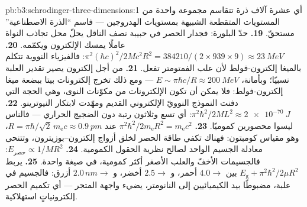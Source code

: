 \begin{solution}{pb:b3:schrodinger-three-dimensions:1}
أي عشرة آلاف ذرة تتقاسم مجموعة واحدة من المستويات المتقطعة
الشبيهة بمستويات الهدروجين --- فاسم ``الذرة الاصطناعية'' مستحقّ.
\textbf{19.} حدّ البلورة: فجدار الحصر في حبيبة نصف
الناقل يحلّ محل تجاذب النواة عاملًا
يمسك الإلكترون ويكمّمه.
\textbf{20.} $\pi^2(\hbar c)^2/2Mc^2R^2 = 384210/(2 \times 939
\times 9) \approx \qty{23}{MeV}$: فالفيزياء النووية تتكلم بالميغا إلكترون-فولط لأن
علب الفمتومتر تفعل.
\textbf{21.} من أجل إلكترون يصير تقدير العلبة نسبيًا؛
وبأمانة، $E \sim \pi\hbar c/R \approx \qty{200}{MeV}$ --- ومع ذلك تخرج
إلكترونات بيتا ببضعة ميغا إلكترون-فولط: فلا يمكن أن تكون الإلكترونات من مكوّنات
النوى، وهي الحجة التي دفنت النموذج النوويّ الإلكتروني القديم
ومهّدت لابتكار النيوترينو.
\textbf{22.} $\pi^2\hbar^2/2ML^2 \approx \qty{2e-70}{J}$:
أي تسع وثلاثون رتبة دون الضجيج الحراري --- فالناس ليسوا محصورين
كموميًا.
\textbf{23.} $\pi^2\hbar^2/2m_{\text{e}}R^2 = m_{\text{e}}c^2$ عند
$R = \pi\hbar/\sqrt2\,m_{\text{e}}c \approx \qty{0.9}{pm}$، وهو
مقياس كومبتون: فهناك تكفي طاقة الحصر لخلق
أزواج إلكترون--بوزيترون، وتتنحى معادلة الجسيم الواحد لصالح
نظرية الحقول الكمومية.
\textbf{24.} $E_{\text{حصر}} \propto 1/MR^2$: فالجسيمات الأخفّ
والعلب الأصغر أكثر كمومية، في صيغة واحدة.
\textbf{25.} يربط $E_{\text{g}} + \pi^2\hbar^2/2\mu R^2$ بين $4.0 \to$
أحمر، و $2.5 \to$ أخضر، و $2.0\,\unit{nm} \to$ أزرق: فالجسيم
في علبة، مضبوطًا بيد الكيميائيين إلى النانومتر، يضيء واجهة
المتجر --- أي تكميم الحصر إلكترونياتٍ استهلاكية.
\end{solution}

